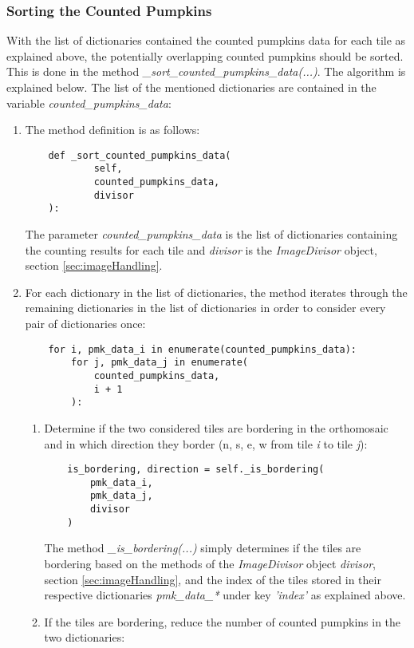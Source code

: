 \documentclass[../Head/Main.tex]{subfiles}
\begin{document}
\subsubsection{Sorting the Counted Pumpkins}
With the list of dictionaries contained the counted pumpkins data for each tile as explained above, the potentially overlapping counted pumpkins should be sorted. This is done in the method \textit{\_sort\_counted\_pumpkins\_data(...)}. The algorithm is explained below. The list of the mentioned dictionaries are contained in the variable \textit{counted\_pumpkins\_data}:
\begin{enumerate}
\item The method definition is as follows:
\begin{verbatim}
    def _sort_counted_pumpkins_data(
            self,
            counted_pumpkins_data,
            divisor
    ):
\end{verbatim}
The parameter \textit{counted\_pumpkins\_data} is the list of dictionaries containing the counting results for each tile and \textit{divisor} is the \textit{ImageDivisor} object, section \ref{sec:imageHandling}.
\item For each dictionary in the list of dictionaries, the method iterates through the remaining dictionaries in the list of dictionaries in order to consider every pair of dictionaries once:
\begin{verbatim}
    for i, pmk_data_i in enumerate(counted_pumpkins_data):
        for j, pmk_data_j in enumerate(
            counted_pumpkins_data,
            i + 1
        ):
\end{verbatim}
\begin{enumerate}
\item Determine if the two considered tiles are bordering in the orthomosaic and in which direction they border (n, s, e, w from tile \textit{i} to tile \textit{j}):
\begin{verbatim}
    is_bordering, direction = self._is_bordering(
        pmk_data_i,
        pmk_data_j,
        divisor
    )
\end{verbatim}
The method \textit{\_is\_bordering(...)} simply determines if the tiles are bordering based on the methods of the \textit{ImageDivisor} object \textit{divisor}, section \ref{sec:imageHandling}, and the index of the tiles stored in their respective dictionaries \textit{pmk\_data\_*} under key \textit{'index'} as explained above.
\item If the tiles are bordering, reduce the number of counted pumpkins in the two dictionaries:

\end{enumerate}
\end{enumerate}
\end{document}
